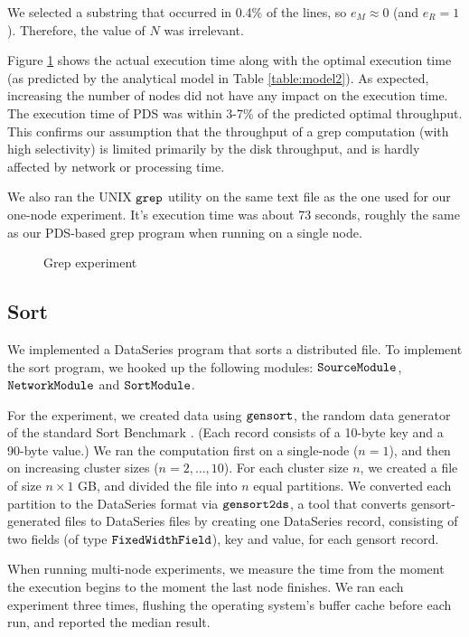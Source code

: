 \documentclass[ 11pt, letterpaper]{article}%
\begin{document}
We selected a
substring that occurred in 0.4\% of the lines, so $e_M \approx 0$ (and $e_R =
1$). Therefore, the value of $N$ was irrelevant.

Figure \ref{fig:grepexperiment} shows the actual execution time along with the optimal
execution time (as predicted by the analytical model in Table
\ref{table:model2}). As expected, increasing the number of nodes did not have
any impact on the execution time. The execution time of PDS was within 3-7\% of
the predicted optimal throughput. This confirms our assumption that the
throughput of a grep computation (with high selectivity) is limited primarily by the disk throughput, and is hardly affected by network or
processing time.

We also ran the UNIX $\tt grep$ utility on the same text file as the one used
for our one-node experiment. It's execution time was about 73 seconds, roughly
the same as our PDS-based grep program when running on a single node.

\begin{figure}
\begin{center}
\caption{Grep experiment}
\label{fig:grepexperiment}
\end{center}
\end{figure}

\subsection{Sort}

We implemented a DataSeries program that sorts a distributed file. To implement the sort program, we hooked up the following
modules: $\tt SourceModule$, $\tt NetworkModule$ and $\tt
SortModule$.

For the experiment, we created data using $\tt gensort$, the random
data generator of the standard Sort Benchmark \cite{sortbenchmark}. (Each record
consists of a 10-byte key and a 90-byte value.) We ran the computation first on
a single-node ($n = 1$), and then on increasing cluster sizes ($n = 2, \ldots,
10$). For each cluster size $n$, we created a file of size $n \times 1$ GB,
and divided the file into $n$ equal partitions. We converted each partition to
the DataSeries format via $\tt gensort2ds$, a tool that converts
gensort-generated files to DataSeries files by creating one DataSeries record,
consisting of two fields (of type $\tt FixedWidthField$), key and value, for
each gensort record.

When running multi-node experiments, we measure
the time from the moment the execution begins to the moment the last node
finishes. We ran each experiment three times, flushing the operating system's
buffer cache before each run, and reported the median result.
\end{document}
